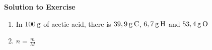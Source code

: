 {\begin{mdframed}[linewidth=4, leftmargin=40, rightmargin=40]
\begin{exercise}
      
      \vspace{5pt}
      \label{m38712*solfhsst!!!underscore!!!id1320}\noindent\textbf{Solution to Exercise } \label{m38712*listfhsst!!!underscore!!!id1320}\begin{enumerate}[noitemsep, label=\textbf{Step} \textbf{\arabic*}. ] 
            \leftskip=20pt\rightskip=\leftskip\item  
      \label{m38712*id281607}In \begin{math}100\phantom{\rule{2pt}{0ex}}\mathrm{g}\end{math} of acetic acid, there is \begin{math}39,9\phantom{\rule{2pt}{0ex}}\mathrm{g}\phantom{\rule{2pt}{0ex}}\mathrm{C}\end{math}, \begin{math}6,7\phantom{\rule{2pt}{0ex}}\mathrm{g}\phantom{\rule{2pt}{0ex}}\mathrm{H}\end{math} and \begin{math}53,4\phantom{\rule{2pt}{0ex}}\mathrm{g}\phantom{\rule{2pt}{0ex}}\mathrm{O}\end{math}\par 
      \pagebreak
      \item  
      \label{m38712*id281633}
        \begin{math}n=\frac{m}{M}\end{math}
      \par 
      \label{m38712*id281653}\nopagebreak\noindent{}
\end{enumerate}
\end{exercise}
\end{mdframed}}

